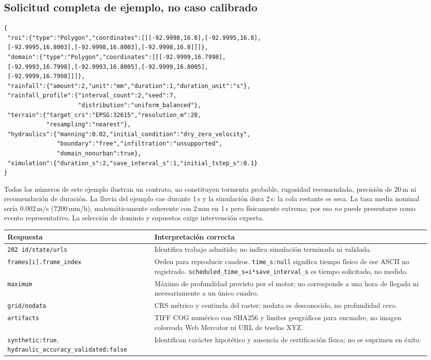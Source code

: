 \documentclass[11pt,a4paper]{article}
\newcommand{\src}[1]{\nolinkurl{#1}}
\begin{document}
\subsection{Solicitud completa de ejemplo, no caso calibrado}
\begin{small}\begin{verbatim}
{
 "roi":{"type":"Polygon","coordinates":[[[-92.9998,16.8],[-92.9995,16.8],
 [-92.9995,16.8003],[-92.9998,16.8003],[-92.9998,16.8]]]},
 "domain":{"type":"Polygon","coordinates":[[[-92.9999,16.7998],
 [-92.9993,16.7998],[-92.9993,16.8005],[-92.9999,16.8005],
 [-92.9999,16.7998]]]},
 "rainfall":{"amount":2,"unit":"mm","duration":1,"duration_unit":"s"},
 "rainfall_profile":{"interval_count":2,"seed":7,
                     "distribution":"uniform_balanced"},
 "terrain":{"target_crs":"EPSG:32615","resolution_m":20,
            "resampling":"nearest"},
 "hydraulics":{"manning":0.02,"initial_condition":"dry_zero_velocity",
               "boundary":"free","infiltration":"unsupported",
               "domain_nonurban":true},
 "simulation":{"duration_s":2,"save_interval_s":1,"initial_tstep_s":0.1}
}
\end{verbatim}\end{small}
Todos los números de este ejemplo ilustran un contrato, no constituyen tormenta probable, rugosidad recomendada, precisión de 20\,m ni recomendación de duración. La lluvia del ejemplo cae durante 1\,s y la simulación dura 2\,s: la cola restante es seca. La tasa media nominal sería $0.002$\,m/s ($7200$\,mm/h), matemáticamente coherente con 2\,mm en 1\,s pero físicamente extrema; por eso \emph{no} puede presentarse como evento representativo. La selección de dominio y supuestos exige intervención experta.

\noindent\begin{tabularx}{\linewidth}{p{.23\linewidth}X}
\toprule Respuesta & Interpretación correcta\\\midrule
\texttt{202 id/state/urls} & Identifica trabajo admitido; no indica simulación terminada ni validada.\\
\src{frames[i].frame_index} & Orden para reproducir cuadros. \texttt{time\_s:null} significa tiempo físico de ese ASCII no registrado. \texttt{scheduled\_time\_s=i*save\_interval\_s} es tiempo solicitado, no medido.\\
\texttt{maximum} & Máximo de profundidad provisto por el motor; no corresponde a una hora de llegada ni necesariamente a un único cuadro.\\
\texttt{grid/nodata} & CRS métrico y centinela del raster; nodata es desconocido, no profundidad cero.\\
\texttt{artifacts} & TIFF COG numérico con SHA256 y límites geográficos para encuadre, no imagen coloreada Web Mercator ni URL de teselas XYZ.\\
\src{synthetic:true}, \src{hydraulic_accuracy_validated:false} & Identifican carácter hipotético y ausencia de certificación física; no se suprimen en éxito.\\\bottomrule
\end{tabularx}
\end{document}
